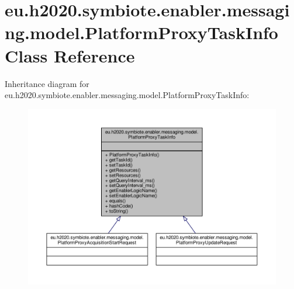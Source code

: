 \hypertarget{classeu_1_1h2020_1_1symbiote_1_1enabler_1_1messaging_1_1model_1_1PlatformProxyTaskInfo}{}\section{eu.\+h2020.\+symbiote.\+enabler.\+messaging.\+model.\+Platform\+Proxy\+Task\+Info Class Reference}
\label{classeu_1_1h2020_1_1symbiote_1_1enabler_1_1messaging_1_1model_1_1PlatformProxyTaskInfo}


Inheritance diagram for eu.\+h2020.\+symbiote.\+enabler.\+messaging.\+model.\+Platform\+Proxy\+Task\+Info\+:
\nopagebreak
\begin{figure}[H]
\begin{center}
\leavevmode
\includegraphics[width=350pt]{classeu_1_1h2020_1_1symbiote_1_1enabler_1_1messaging_1_1model_1_1PlatformProxyTaskInfo__inherit__graph}
\end{center}
\end{figure}


